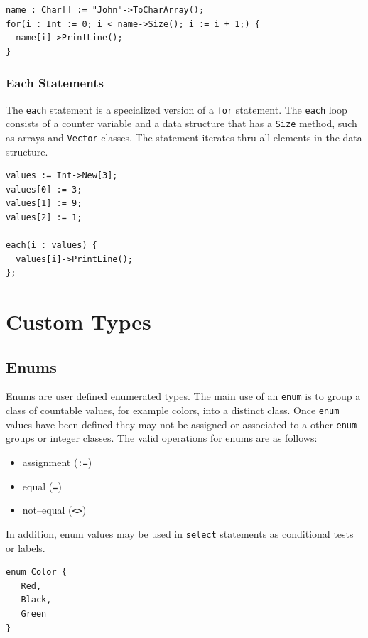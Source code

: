 \documentclass[12pt]{article}
\begin{document}
\begin{verbatim}
name : Char[] := "John"->ToCharArray();
for(i : Int := 0; i < name->Size(); i := i + 1;) {
  name[i]->PrintLine();
}
\end{verbatim}

\subsubsection{Each Statements}

The \texttt{each} statement is a specialized version of a \texttt{for} statement.  The \texttt{each} loop consists of a counter variable and a data structure that has a \texttt{Size} method, such as arrays and \texttt{Vector} classes.  The statement iterates thru all elements in the data structure.

\begin{verbatim}
values := Int->New[3];
values[0] := 3;
values[1] := 9;
values[2] := 1;

each(i : values) {
  values[i]->PrintLine();
};
\end{verbatim}

\section{Custom Types}

\subsection{Enums}
Enums are user defined enumerated types.  The main use of an  \texttt{enum}  is to group a class of countable values, for example colors, into a distinct class.  Once \texttt{enum}  values have been defined they may not be assigned or associated to a other \texttt{enum}  groups or integer classes.  The valid operations for enums are as follows:

\begin{itemize}
    \item assignment (\texttt{:=})
    \item equal (\texttt{=})
    \item not--equal (\texttt{<>})
\end{itemize}

In addition, enum values may be used in \texttt{select} statements as conditional tests or labels.

\begin{verbatim}
enum Color {
   Red,
   Black,
   Green
}
\end{verbatim}
\end{document}
